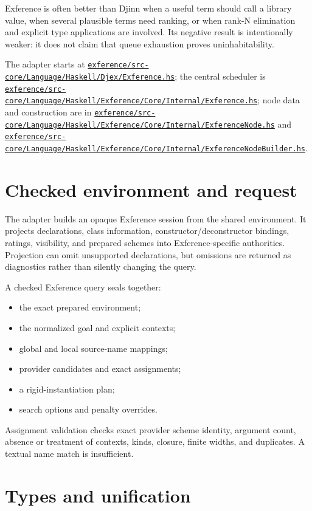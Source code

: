 \documentclass[10pt,letterpaper,oneside]{report}
\def\DjexBase{https://github.com/VladimirReshetnikov/Djex/blob/d3d9662598460316bdcd177ce6768c521e764aa8/}
\newcommand{\dpath}[1]{\href{\DjexBase#1}{\nolinkurl{#1}}}
\begin{document}
Exference is often better than Djinn when a useful term should call a library value, when several plausible terms need ranking, or when rank-N elimination and explicit type applications are involved. Its negative result is intentionally weaker: it does not claim that queue exhaustion proves uninhabitability.

The adapter starts at \dpath{exference/src-core/Language/Haskell/Djex/Exference.hs}; the central scheduler is \dpath{exference/src-core/Language/Haskell/Exference/Core/Internal/Exference.hs}; node data and construction are in \dpath{exference/src-core/Language/Haskell/Exference/Core/Internal/ExferenceNode.hs} and \dpath{exference/src-core/Language/Haskell/Exference/Core/Internal/ExferenceNodeBuilder.hs}.

\section{Checked environment and request}

The adapter builds an opaque Exference session from the shared environment. It projects declarations, class information, constructor/deconstructor bindings, ratings, visibility, and prepared schemes into Exference-specific authorities. Projection can omit unsupported declarations, but omissions are returned as diagnostics rather than silently changing the query.

A checked Exference query seals together:

\begin{itemize}
  \item the exact prepared environment;
  \item the normalized goal and explicit contexts;
  \item global and local source-name mappings;
  \item provider candidates and exact assignments;
  \item a rigid-instantiation plan;
  \item search options and penalty overrides.
\end{itemize}

Assignment validation checks exact provider scheme identity, argument count, absence or treatment of contexts, kinds, closure, finite widths, and duplicates. A textual name match is insufficient.

\section{Types and unification}\label{sec:exference-unify}
\end{document}
